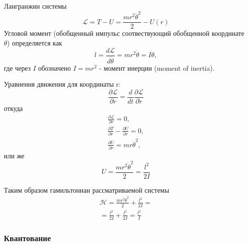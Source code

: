 Лангранжин системы
\[
\mathcal{L} = T - U = \frac{m r^2 \dot{\theta}^2 }{2} - U\left( r \right)
\]
Угловой момент (обобщенный импульс соотвествующий обобщенной
координате $\theta$) определяется как 
\begin{equation}
l = \frac{d \mathcal{L}}{d \dot{\theta}} = 
m r^2 \dot{\theta} = I \dot{\theta},
\label{eqAngualrMomentumClass}
\end{equation}
где через $I$ обозначено $I = m r^2$ - момент инерции (moment of
inertia).

Уравнения движения для координаты r:
\[
\frac{ \partial \mathcal{L} }{\partial r} = 
\frac{d}{d t} \frac{\partial \mathcal{L}}{\partial \dot{r}}
\]
 откуда
\begin{eqnarray}
\frac{ \partial \mathcal{L} }{\partial r} = 0,
\nonumber \\
\frac{ \partial T }{\partial r} - \frac{ \partial U }{\partial r} = 0,
\nonumber \\
\frac{\partial U}{\partial r} = m r \dot{\theta}^2,
\nonumber
\end{eqnarray}
 или же
\[
 U = \frac{m r^2 \dot{\theta}^2}{2} = \frac{l^2}{2 I}
\]
 
Таким образом гамильтониан  рассматриваемой системы
\begin{eqnarray}
\mathcal{H} = \frac{m r^2 \dot{\theta}^2 }{2} + \frac{l^2}{2 I} = 
\nonumber \\
= \frac{l^2}{2 I} + \frac{l^2}{2 I} = \frac{l^2}{I}
\label{eqHClassical}
\end{eqnarray}

\subsubsection{Квантование}

